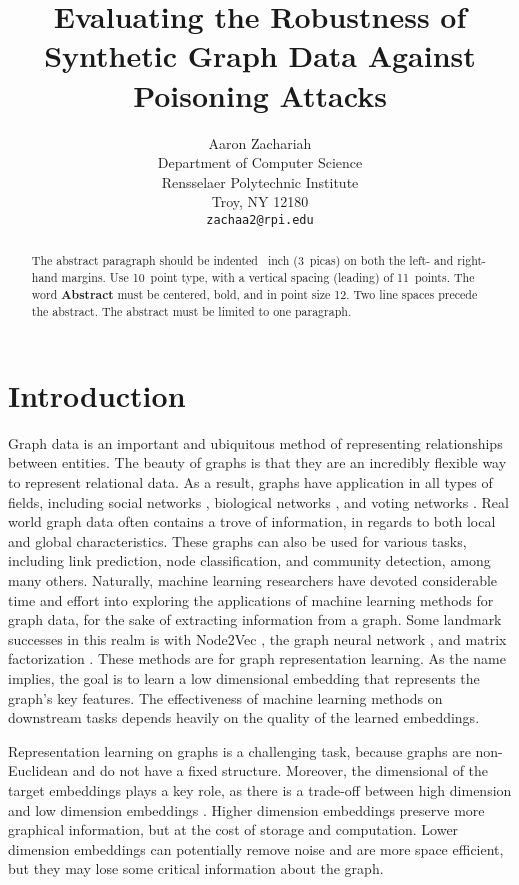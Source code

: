 \documentclass{article}
\title{Evaluating the Robustness of Synthetic Graph Data Against Poisoning Attacks}
\author{
  Aaron Zachariah \\
  Department of Computer Science\\
  Rensselaer Polytechnic Institute\\
  Troy, NY 12180 \\
  \texttt{zachaa2@rpi.edu} \\
}
\begin{document}
\maketitle


\begin{abstract}
  The abstract paragraph should be indented ~inch (3~picas) on
  both the left- and right-hand margins. Use 10~point type, with a vertical
  spacing (leading) of 11~points.  The word \textbf{Abstract} must be centered,
  bold, and in point size 12. Two line spaces precede the abstract. The abstract
  must be limited to one paragraph.
\end{abstract}


\section{Introduction}
\label{Intro}

Graph data is an important and ubiquitous method of representing relationships between entities. The beauty of graphs is that they are an incredibly flexible way to represent relational data. As a result, graphs have application in all types of fields, including social networks \cite{socialnetworks}, biological networks \cite{Girvan_2002}, and voting networks \cite{votingnetworks}. Real world graph data often contains a trove of information, in regards to both local and global characteristics. These graphs can also be used for various tasks, including link prediction, node classification, and community detection, among many others. Naturally, machine learning researchers have devoted considerable time and effort into exploring the applications of machine learning methods for graph data, for the sake of extracting information from a graph. Some landmark successes in this realm is with Node2Vec \cite{grover2016node2vec}, the graph neural network \cite{GNNModel}, and matrix factorization \cite{matrixfactor}. These methods are for graph representation learning. As the name implies, the goal is to learn a low dimensional embedding that represents the graph's key features. The effectiveness of machine learning methods on downstream tasks depends heavily on the quality of the learned embeddings. 

Representation learning on graphs is a challenging task, because graphs are non-Euclidean and do not have a fixed structure. Moreover, the dimensional of the target embeddings plays a key role, as there is a trade-off between high dimension and low dimension embeddings \cite{DBLP:journals/corr/abs-1909-00958}. Higher dimension embeddings preserve more graphical information, but at the cost of storage and computation. Lower dimension embeddings can potentially remove noise and are more space efficient, but they may lose some critical information about the graph. 
\end{document}
